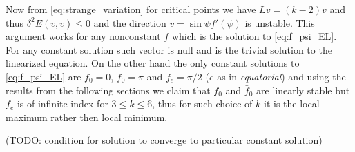Now from \eqref{eq:strange_variation} for critical points we have
$Lv=(k-2)v$ and thus $\delta^2 E(v,v)\le0$ and the direction
$v=\sin\psi f'(\psi)$ is unstable. This argument works for any
nonconstant $f$ which is the solution to \eqref{eq:f_psi_EL}. For any
constant solution such vector is null and is the trivial solution to
the linearized equation. On the other hand the only constant solutions
to \eqref{eq:f_psi_EL} are $f_0=0$, $\bar{f}_0=\pi$ and $f_e=\pi/2$
($e$ as in \emph{equatorial}) and using the results from the following
sections we claim that $f_0$ and $\bar{f}_0$ are linearly stable but
$f_e$ is of infinite index for $3\le k\le6$, thus for such choice of
$k$ it is the local maximum rather then local minimum.


(TODO: condition for solution to converge to particular constant
solution)

